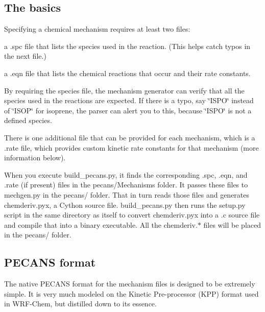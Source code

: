 \subsection*{The basics}

Specifying a chemical mechanism requires at least two files\+:


\begin{DoxyItemize}
\item a {\ttfamily .spc} file that lists the species used in the reaction. (This helps catch typos in the next file.)
\item a {\ttfamily .eqn} file that lists the chemical reactions that occur and their rate constants.
\end{DoxyItemize}

By requiring the species file, the mechanism generator can verify that all the species used in the reactions are expected. If there is a typo, say \char`\"{}\+I\+S\+P\+O\char`\"{} instead of \char`\"{}\+I\+S\+O\+P\char`\"{} for isoprene, the parser can alert you to this, because \char`\"{}\+I\+S\+P\+O\char`\"{} is not a defined species.

There is one additional file that can be provided for each mechanism, which is a {\ttfamily .rate} file, which provides custom kinetic rate constants for that mechanism (more information below).

When you execute {\ttfamily build\+\_\+pecans.\+py}, it finds the corresponding {\ttfamily .spc}, {\ttfamily .eqn}, and {\ttfamily .rate} (if present) files in the pecans/\+Mechanisms folder. It passes these files to {\ttfamily mechgen.\+py} in the pecans/ folder. That in turn reads those files and generates {\ttfamily chemderiv.\+pyx}, a Cython source file. {\ttfamily build\+\_\+pecans.\+py} then runs the {\ttfamily setup.\+py} script in the same directory as itself to convert {\ttfamily chemderiv.\+pyx} into a {\ttfamily .c} source file and compile that into a binary executable. All the {\ttfamily chemderiv.$\ast$} files will be placed in the pecans/ folder.

\subsection*{P\+E\+C\+A\+NS format}

The native P\+E\+C\+A\+NS format for the mechanism files is designed to be extremely simple. It is very much modeled on the Kinetic Pre-\/processor (K\+PP) format used in W\+R\+F-\/\+Chem, but distilled down to its essence.

